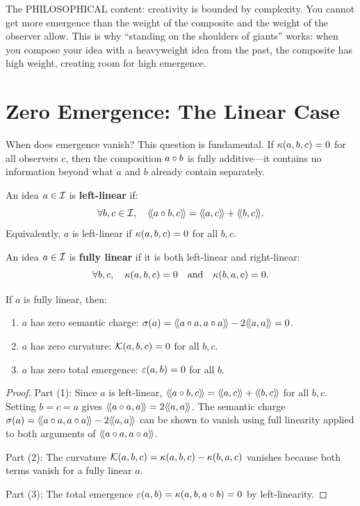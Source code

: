 \begin{interpretation}
The PHILOSOPHICAL content: creativity is bounded by complexity. You cannot get
more emergence than the weight of the composite and the weight of the observer
allow. This is why ``standing on the shoulders of giants'' works: when you
compose your idea with a heavyweight idea from the past, the composite has high
weight, creating room for high emergence.
\end{interpretation}


\section{Zero Emergence: The Linear Case}

When does emergence vanish? This question is fundamental. If $\kappa(a,b,c) = 0$
for all observers $c$, then the composition $a \circ b$ is fully additive---it
contains no information beyond what $a$ and $b$ already contain separately.

\begin{definition}
\label{def:left-linear}
An idea $a \in \mathcal{I}$ is \textbf{left-linear} if:
\[
  \forall b, c \in \mathcal{I}, \quad \langle\!\langle a \circ b, c \rangle\!\rangle = \langle\!\langle a, c \rangle\!\rangle + \langle\!\langle b, c \rangle\!\rangle.
\]
Equivalently, $a$ is left-linear if $\kappa(a, b, c) = 0$ for all $b, c$.
\end{definition}

\begin{definition}
\label{def:fully-linear}
An idea $a \in \mathcal{I}$ is \textbf{fully linear} if it is both left-linear and
right-linear:
\[
  \forall b, c, \quad \kappa(a, b, c) = 0 \quad\text{and}\quad \kappa(b, a, c) = 0.
\]
\end{definition}

\begin{theorem}
\label{thm:fully-linear-consequences}
If $a$ is fully linear, then:
\begin{enumerate}
  \item $a$ has zero semantic charge: $\sigma(a) = \langle\!\langle a \circ a, a \circ a \rangle\!\rangle - 2\langle\!\langle a, a \rangle\!\rangle = 0$.
  \item $a$ has zero curvature: $\mathcal{K}(a, b, c) = 0$ for all $b, c$.
  \item $a$ has zero total emergence: $\varepsilon(a, b) = 0$ for all $b$.
\end{enumerate}
\end{theorem}

\begin{proof}
Part (1): Since $a$ is left-linear, $\langle\!\langle a \circ b, c \rangle\!\rangle = \langle\!\langle a, c \rangle\!\rangle + \langle\!\langle b, c \rangle\!\rangle$
for all $b, c$. Setting $b = c = a$ gives $\langle\!\langle a \circ a, a \rangle\!\rangle = 2\langle\!\langle a, a \rangle\!\rangle$.
The semantic charge $\sigma(a) = \langle\!\langle a \circ a, a \circ a \rangle\!\rangle - 2\langle\!\langle a, a \rangle\!\rangle$
can be shown to vanish using full linearity applied to both arguments of
$\langle\!\langle a \circ a, a \circ a \rangle\!\rangle$.

Part (2): The curvature $\mathcal{K}(a,b,c) = \kappa(a,b,c) - \kappa(b,a,c)$ vanishes
because both terms vanish for a fully linear $a$.

Part (3): The total emergence $\varepsilon(a,b) = \kappa(a,b,a \circ b) = 0$
by left-linearity.
\end{proof}

